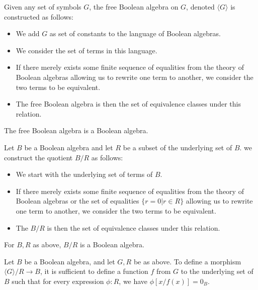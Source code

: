 \documentclass{../util/zariski-small}
\begin{document}
\begin{definition}
  Given any set of symbols $G$, the free Boolean algebra on $G$, denoted $\langle G \rangle$
  is constructed as follows:
  \begin{itemize}
    \item We add $G$ as set of constants to the language of Boolean algebras. 
    \item We consider the set of terms in this language. 
    \item If there merely exists some finite sequence of 
      equalities from the theory of Boolean algebras allowing us to rewrite one term to another, 
      we consider the two terms to be equivalent. 
    \item The free Boolean algebra is then the set of equivalence classes under this relation. 
  \end{itemize}
\end{definition}
\begin{remark}
  The free Boolean algebra is a Boolean algebra. 
\end{remark}
\begin{definition}
  Let $B$ be a Boolean algebra and let $R$ be a subset of the underlying set of $B$. 
  we construct the quotient $B / R$ as follows:
  \begin{itemize}
    \item We start with the underlying set of terms of $B$. %
    \item If there merely exists some finite sequence of 
      equalities from the theory of Boolean algebras or the set of equalities $\{r = 0 | r \in R\}$ 
      allowing us to rewrite one term to another, we consider the two terms to be equivalent. 
    \item The $B / R$ is then the set of equivalence classes under this relation. 
  \end{itemize}
\end{definition}
\begin{remark}
  For $B,R$ as above, $B / R$ is a Boolean algebra. 
\end{remark}
\begin{remark}\label{rmkMorphismsOutOfQuotient}
  Let $B$ be a Boolean algebra, and let $G,R$ be as above. 
  To define a morphism $\langle G \rangle / R \to B$, it is sufficient to define a function $f$ from $G$ 
  to the underlying set of $B$ such that for every expression $\phi:R$, we have
  $\phi[x/f(x)] = 0_B$. 
\end{remark}
\end{document}
